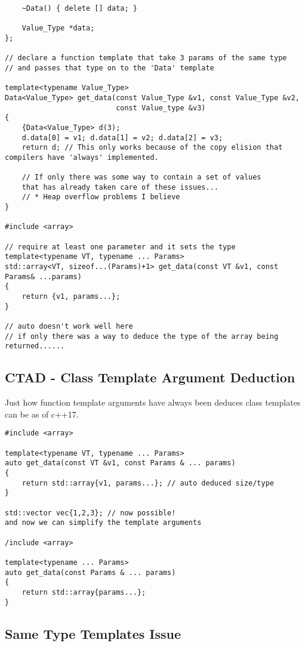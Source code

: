 \begin{verbatim}
    ~Data() { delete [] data; }

    Value_Type *data;
};

// declare a function template that take 3 params of the same type
// and passes that type on to the 'Data' template

template<typename Value_Type>
Data<Value_Type> get_data(const Value_Type &v1, const Value_Type &v2,
                          const Value_type &v3)
{
    {Data<Value_Type> d(3);
    d.data[0] = v1; d.data[1] = v2; d.data[2] = v3;
    return d; // This only works because of the copy elision that compilers have 'always' implemented.

    // If only there was some way to contain a set of values
    that has already taken care of these issues...  
    // * Heap overflow problems I believe
}

#include <array>

// require at least one parameter and it sets the type
template<typename VT, typename ... Params>
std::array<VT, sizeof...(Params)+1> get_data(const VT &v1, const Params& ...params)
{
    return {v1, params...};
}

// auto doesn't work well here
// if only there was a way to deduce the type of the array being returned......
\end{verbatim}

\subsection{CTAD - Class Template Argument Deduction}

Just how function template arguments have always been deduces class templates can be as of c++17.

\begin{verbatim}
#include <array>

template<typename VT, typename ... Params>
auto get_data(const VT &v1, const Params & ... params)
{
    return std::array{v1, params...}; // auto deduced size/type
}

std::vector vec{1,2,3}; // now possible! 
and now we can simplify the template arguments

/include <array>

template<typename ... Params>
auto get_data(const Params & ... params)
{
    return std::array{params...};
}
\end{verbatim}
\subsection{Same Type Templates Issue}

